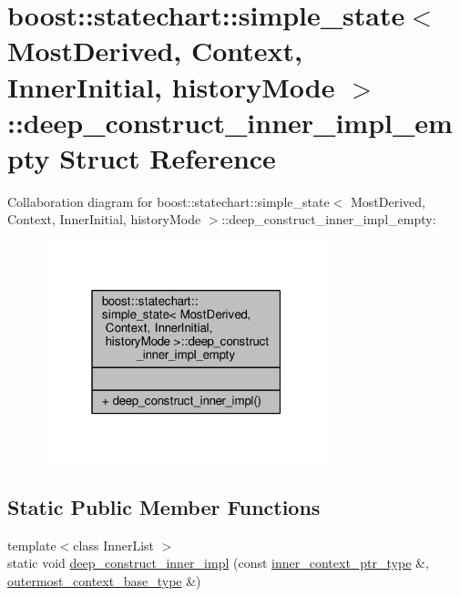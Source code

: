 \hypertarget{structboost_1_1statechart_1_1simple__state_1_1deep__construct__inner__impl__empty}{}\section{boost\+:\+:statechart\+:\+:simple\+\_\+state$<$ Most\+Derived, Context, Inner\+Initial, history\+Mode $>$\+:\+:deep\+\_\+construct\+\_\+inner\+\_\+impl\+\_\+empty Struct Reference}
\label{structboost_1_1statechart_1_1simple__state_1_1deep__construct__inner__impl__empty}


Collaboration diagram for boost\+:\+:statechart\+:\+:simple\+\_\+state$<$ Most\+Derived, Context, Inner\+Initial, history\+Mode $>$\+:\+:deep\+\_\+construct\+\_\+inner\+\_\+impl\+\_\+empty\+:
\nopagebreak
\begin{figure}[H]
\begin{center}
\leavevmode
\includegraphics[width=235pt]{structboost_1_1statechart_1_1simple__state_1_1deep__construct__inner__impl__empty__coll__graph}
\end{center}
\end{figure}
\subsection*{Static Public Member Functions}
\begin{DoxyCompactItemize}
\item 
{\footnotesize template$<$class Inner\+List $>$ }\\static void \mbox{\hyperlink{structboost_1_1statechart_1_1simple__state_1_1deep__construct__inner__impl__empty_a0d7459c5a6ad00dc420937a21fb989e0}{deep\+\_\+construct\+\_\+inner\+\_\+impl}} (const \mbox{\hyperlink{classboost_1_1statechart_1_1simple__state_ad6d3233a11a23e91b4cc9edcae799379}{inner\+\_\+context\+\_\+ptr\+\_\+type}} \&, \mbox{\hyperlink{classboost_1_1statechart_1_1simple__state_a50f21d7a7d6632eb34430e74cbad3197}{outermost\+\_\+context\+\_\+base\+\_\+type}} \&)
\end{DoxyCompactItemize}


